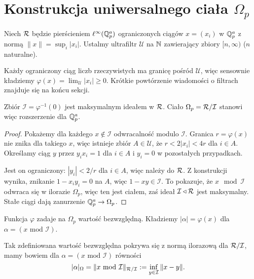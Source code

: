 \section{Konstrukcja uniwersalnego ciała $\Omega_p$}
Niech $\mathcal R$ będzie pierścieniem $\ell^\infty(\mathbb Q_p^a)$ ograniczonych ciągów $x = (x_i)$ w $\mathbb Q_p^a$ z normą $\|x\| = \sup_i |x_i|$. 
Ustalmy ultrafiltr $\mathcal U$ na $\mathbb N$ zawierający zbiory $[n, \infty)$ ($n$ naturalne).

Każdy ograniczony ciąg liczb rzeczywistych ma granicę pośród $\mathcal U$, więc sensownie kładziemy $\varphi(x) = \lim_{\mathcal U} |x_i| \ge 0$.
Krótkie powtórzenie wiadomości o filtrach znajduje się na końcu sekcji.

\begin{fakt}
	Zbiór $\mathcal I = \varphi^{-1}(0)$ jest maksymalnym ideałem w $\mathcal R$.
	Ciało $\Omega_p = \mathcal R / \mathcal I$ stanowi więc rozszerzenie dla $\mathbb Q_p^a$.
\end{fakt}

\begin{proof}
	Pokażemy dla każdego $x \not \in \mathcal I$ odwracalność modulo $\mathcal I$.
	Granica $r = \varphi(x)$ nie znika dla takiego $x$, więc istnieje zbiór $A \in \mathcal U$, że $r < 2 |x_i| < 4r$ dla $i \in A$.
	Określamy ciąg $y$ przez $y_i x_i = 1$ dla $i \in A$ i $y_i = 0$ w pozostałych przypadkach.

	Jest on ograniczony: $|y_i| < 2 / r$ dla $i \in A$, więc należy do $\mathcal R$.
	Z konstrukcji wynika, znikanie $1 - x_iy_i = 0$ na $A$, więc $1 - xy \in \mathcal I$.
	To pokazuje, że $x \mod \mathcal I$ odwraca się w ilorazie $\Omega_p$, więc ten jest ciałem, zaś ideał $\mathcal I \triangleleft \mathcal R$ jest maksymalny.
	Stałe ciągi dają zanurzenie $\mathbb Q_p^a \to \Omega_p$.
\end{proof}

Funkcja $\varphi$ zadaje na $\Omega_p$ wartość bezwzględną.
Kładziemy $|\alpha| = \varphi(x)$ dla $\alpha = (x \mbox{ mod } \mathcal I)$.

\begin{fakt}
	Tak zdefiniowana wartość bezwzględna pokrywa się z normą ilorazową dla $\mathcal R / \mathcal I$, mamy bowiem dla $\alpha = (x \mbox { mod } \mathcal I)$ równości
	\[
		|\alpha|_\Omega = \|x \mbox{ mod }\mathcal I\|_{\mathcal R / \mathcal I} := \inf_{y \in \mathcal I} \|x - y\|.
	\]
\end{fakt}

